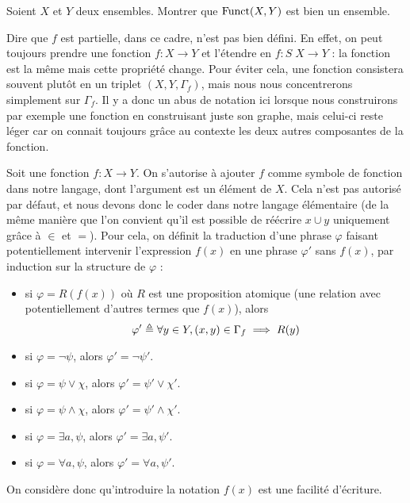 \begin{exercise}
  Soient $X$ et $Y$ deux ensembles. Montrer que $\operatorname{Funct}(X,Y)$ est bien un
  ensemble.
\end{exercise}

\begin{remark}
  Dire que $f$ est partielle, dans ce cadre, n'est pas bien défini. En effet, on
  peut toujours prendre une fonction $f : X \to Y$ et l'étendre en
  $f : S\;X \to Y$ : la fonction est la même mais cette propriété change. Pour
  éviter cela, une fonction consistera souvent plutôt en un triplet
  $(X,Y,\Gamma_f)$, mais nous nous concentrerons simplement sur $\Gamma_f$. Il y
  a donc un abus de notation ici lorsque nous construirons par exemple une
  fonction en construisant juste son graphe, mais celui-ci reste léger car on
  connait toujours grâce au contexte les deux autres composantes de la fonction.
\end{remark}

\begin{notation}
  Soit une fonction $f : X \to Y$. On s'autorise à ajouter $f$ comme symbole de
  fonction dans notre langage, dont l'argument est un élément de $X$. Cela n'est
  pas autorisé par défaut, et nous devons donc le coder dans notre langage
  élémentaire (de la même manière que l'on convient qu'il est possible de
  réécrire $x\cup y$ uniquement grâce à $\in$ et $=$). Pour cela, on définit la
  traduction d'une phrase $\varphi$ faisant potentiellement intervenir
  l'expression $f(x)$ en une phrase $\varphi'$ sans $f(x)$, par induction sur
  la structure de $\varphi$ :
  \begin{itemize}
  \item si $\varphi = R(f(x))$ où $R$ est une proposition atomique (une relation
    avec potentiellement d'autres termes que $f(x)$), alors
    \[\varphi' \triangleq \forall y\in Y, (x,y)\in \Gamma_f \implies R(y)\]
  \item si $\varphi = \lnot \psi$, alors $\varphi' = \lnot \psi'$.
  \item si $\varphi = \psi \lor \chi$, alors $\varphi' = \psi'\lor \chi'$.
  \item si $\varphi = \psi \land \chi$, alors $\varphi' = \psi'\land \chi'$.
  \item si $\varphi = \exists a, \psi$, alors $\varphi' = \exists a, \psi'$.
  \item si $\varphi = \forall a, \psi$, alors $\varphi' = \forall a, \psi'$.
  \end{itemize}

  On considère donc qu'introduire la notation $f(x)$ est une facilité
  d'écriture.
\end{notation}

